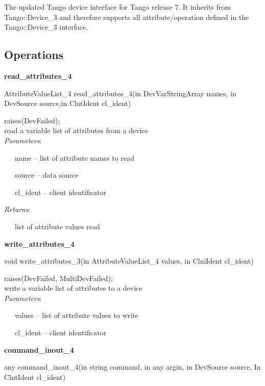 The updated Tango device interface for Tango release 7. It inherits
from Tango::Device\_3 and therefore supports all attribute/operation
defined in the Tango::Device\_3 interface.


\subsection{Operations}

\textbf{read\_attributes\_4}

AttributeValueList\_4 read\_attributes\_4(in DevVarStringArray names,
in DevSource source,in ClntIdent cl\_ident)

raises(DevFailed);\\


read a variable list of attributes from a device\\


\emph{Parameters}:

~~~name -- list of attribute names to read

~~~source -- data source

~~~cl\_ident -- client identificator

\emph{Returns}:

~~~list of attribute values read \textbf{}\\


\begin{flushleft}
\textbf{write\_attributes\_4}
\par\end{flushleft}

void write\_attributes\_3(in AttributeValueList\_4 values, in ClniIdent
cl\_ident)

raises(DevFailed, MultiDevFailed);\\


write a variable list of attributes to a device\\


\emph{Parameters}:

~~~values -- list of attribute values to write

~~~cl\_ident -- client identificator\\


\begin{flushleft}
\textbf{command\_inout\_4}
\par\end{flushleft}

any command\_inout\_4(in string command, in any argin, in DevSource
source, In ClntIdent cl\_ident)


